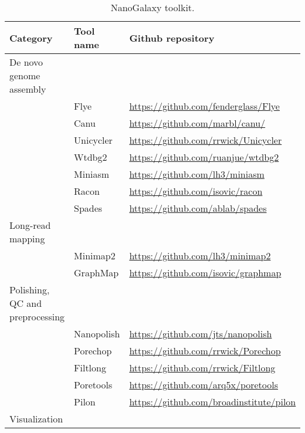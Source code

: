 \documentclass[a4paper,num-refs]{oup-contemporary}
\begin{document}
\begin{table*}[b!]
\caption{NanoGalaxy toolkit.}\label{tab:NanoGalaxyToolkit}
\begin{tabular}{l l l}
\toprule
Category & Tool name & Github repository\\
\midrule
De novo genome assembly         &            &                                               \\
                                & Flye       & \url{https://github.com/fenderglass/Flye}     \\
                                & Canu       & \url{https://github.com/marbl/canu/}          \\
                                & Unicycler  & \url{https://github.com/rrwick/Unicycler}     \\
                                & Wtdbg2     & \url{https://github.com/ruanjue/wtdbg2}       \\
                                & Miniasm    & \url{https://github.com/lh3/miniasm}          \\
                                & Racon      & \url{https://github.com/isovic/racon}         \\
                                & Spades     & \url{https://github.com/ablab/spades}         \\
Long-read mapping               &            &                                               \\
                                & Minimap2   & \url{https://github.com/lh3/minimap2}         \\
                                & GraphMap   & \url{https://github.com/isovic/graphmap}      \\
Polishing, QC and preprocessing &            &                                               \\
                                & Nanopolish & \url{https://github.com/jts/nanopolish}       \\
                                & Porechop   & \url{https://github.com/rrwick/Porechop}      \\
                                & Filtlong   & \url{https://github.com/rrwick/Filtlong}      \\
                                & Poretools  & \url{https://github.com/arq5x/poretools}      \\
                                & Pilon      & \url{https://github.com/broadinstitute/pilon} \\
Visualization                   &            &                                               \\

\end{tabular}
\end{table*}
\end{document}
